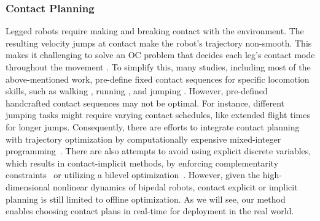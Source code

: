 \subsubsection{Contact Planning}
Legged robots require making and breaking contact with the environment. 
The resulting velocity jumps at contact make the robot's trajectory non-smooth.
This makes it challenging to solve an OC problem that decides each leg's contact mode throughout the movement \citep{posa2014direct}.
To simplify this, many studies, including most of the above-mentioned work, pre-define fixed contact sequences for specific locomotion skills, such as walking \citep{caron2019stair, hereid2019rapid, xiong20223}, running \citep{takenaka2009realrunning,sreenath2013embedding,ma2017bipedal}, and jumping \citep{goswami2009planar,chignoli2021humanoid,qi2023vertical}.
However, pre-defined handcrafted contact sequences may not be optimal. For instance, different jumping tasks might require varying contact schedules, like extended flight times for longer jumps. 
Consequently, there are efforts to integrate contact planning with trajectory optimization by computationally expensive mixed-integer programming~\citep{deits2014footstep,ibanez2014emergence}.
There are also attempts to avoid using explicit discrete variables, which results in contact-implicit methods, by enforcing complementarity constraints~\citep{dai2014whole,posa2014direct,drnach2021robust} or utilizing a bilevel optimization~\citep{landry2022bilevel,zhu2021contact,cleac2021fast}.  
However, given the high-dimensional nonlinear dynamics of bipedal robots, contact explicit or implicit planning is still limited to offline optimization.
As we will see, our method enables choosing contact plans in real-time for deployment in the real world. 


